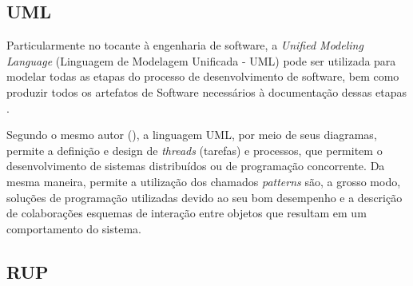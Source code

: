 \subsection{UML}

Particularmente no tocante à engenharia de software, a \textit{Unified Modeling Language} (Linguagem de Modelagem Unificada - UML) pode ser utilizada para modelar todas as etapas do processo de desenvolvimento de software, bem como produzir todos os artefatos de Software necessários à documentação dessas etapas \cite[p. 12]{eng-2015}.

Segundo o mesmo autor (\citeyear{eng-2015}), a linguagem UML, por meio de seus diagramas, permite a definição e design de \textit{threads} (tarefas) e processos, que permitem o desenvolvimento de sistemas distribuídos ou de programação concorrente. Da mesma maneira, permite a utilização dos chamados \textit{patterns} são, a grosso modo, soluções de programação utilizadas devido ao seu bom desempenho e a descrição de colaborações esquemas de interação entre objetos que resultam em um comportamento do sistema.

\subsection{RUP}